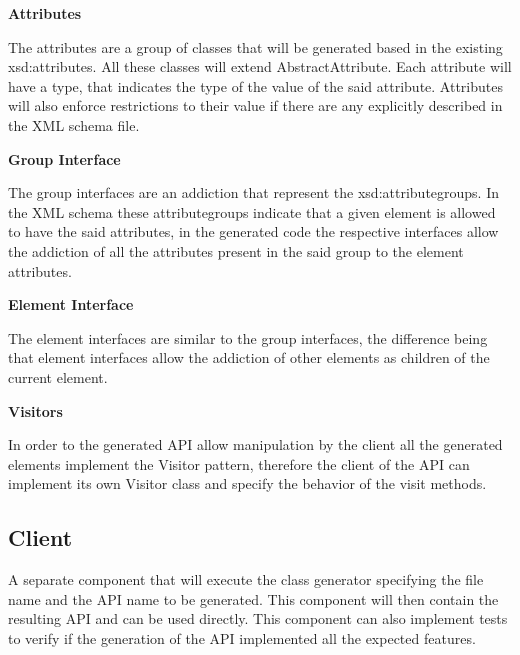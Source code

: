 \textbf{Attributes}

The attributes are a group of classes that will be generated based in the existing xsd:attributes. All these classes will extend AbstractAttribute. Each attribute will have a type, that indicates the type of the value of the said attribute. Attributes will also enforce restrictions to their value if there are any explicitly described in the XML schema file.

\textbf{Group Interface}

The group interfaces are an addiction that represent the xsd:attributegroups. In the XML schema these attributegroups indicate that a given element is allowed to have the said attributes, in the generated code the respective interfaces allow the addiction of all the attributes present in the said group to the element attributes.

\textbf{Element Interface}

The element interfaces are similar to the group interfaces, the difference being that element interfaces allow the addiction of other elements as children of the current element. 

\textbf{Visitors}

In order to the generated API allow manipulation by the client all the generated elements implement the Visitor pattern, therefore the client of the API can implement its own Visitor class and specify the behavior of the visit methods.

\subsection{Client}

A separate component that will execute the class generator specifying the file name and the API name to be generated. This component will then contain the resulting API and can be used directly. This component can also implement tests to verify if the generation of the API implemented all the expected features.